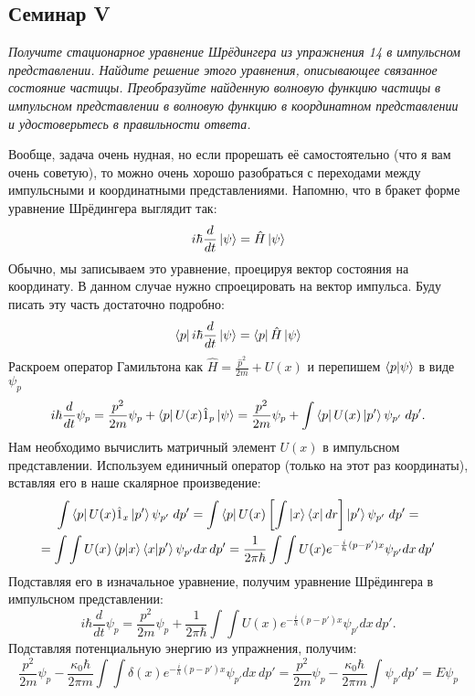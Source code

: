 \begin{center}
    \section{Семинар V}
\end{center}
\begin{center}
    \textit{Получите стационарное уравнение Шрёдингера из упражнения 14 в импульсном представлении. Найдите решение этого уравнения, описывающее связанное состояние частицы. Преобразуйте найденную волновую функцию частицы в импульсном представлении в волновую функцию в координатном представлении и удостоверьтесь в правильности ответа.}
\end{center}

Вообще, задача очень нудная, но если прорешать её самостоятельно (что я вам очень советую), то можно очень хорошо разобраться с переходами между импульсными и координатными представлениями. Напомню, что в бракет форме уравнение Шрёдингера выглядит так:
\[
i\hbar \frac{d}{dt} \ket{\psi} = \hat H \ket{\psi}
\]
Обычно, мы записываем это уравнение, проецируя вектор состояния на координату. В данном случае нужно спроецировать на вектор импульса. Буду писать эту часть достаточно подробно:
\[
\bra{p} i\hbar \frac{d}{dt} \ket{\psi} = \bra{p} \hat H \ket{\psi}
\]
Раскроем оператор Гамильтона как $\hat H = \frac{\hat p^2}{2m} + U(x)$ и перепишем $\bra{p}\ket{\psi}$ в виде $\psi_p$
\[
i\hbar \frac{d}{dt} \psi_p = \frac{p^2}{2m}\psi_p + \bra{p}U(x)\hat{1}_p\ket{\psi} = \frac{p^2}{2m}\psi_p + \int\bra{p}U(x)\ket{p'}\psi_{p'}\;dp'.
\]
Нам необходимо вычислить матричный элемент $U(x)$ в импульсном представлении. Используем единичный оператор (только на этот раз координаты), вставляя его в наше скалярное произведение:
\begin{gather*}
\int\bra{p}U(x)\hat{1}_x\ket{p'}\psi_{p'}\;dp' = \int \bra{p}U(x)\left[\int\ket{x}\bra{x}dr\right]\ket{p'} \psi_{p'}\;dp'= \\
= \int\int U(x)\bra{p}\ket{x}\bra{x}\ket{p'} \psi_{p'} dx\,dp' = \frac{1}{2\pi\hbar}\int\int U(x) e^{-\frac{i}{h}(p-p')x}\psi_{p'} dx\,dp'
\end{gather*}
Подставляя его в изначальное уравнение, получим уравнение Шрёдингера в импульсном представлении:
\[
i\hbar \frac{d}{dt} \psi_p =\frac{p^2}{2m}\psi_p + \frac{1}{2\pi\hbar}\int\int U(x) e^{-\frac{i}{h}(p-p')x}\psi_{p'} dx\,dp'.
\]
Подставляя потенциальную энергию из упражнения, получим:
\[
\frac{p^2}{2m}\psi_p - \frac{\kappa_0\hbar}{2\pi m}\int\int \delta(x) e^{-\frac{i}{h}(p-p')x}\psi_{p'} dx\,dp'= \frac{p^2}{2m}\psi_p - \frac{\kappa_0\hbar}{2\pi m}\int\psi_{p'} dp' =  E\psi_p
\]

